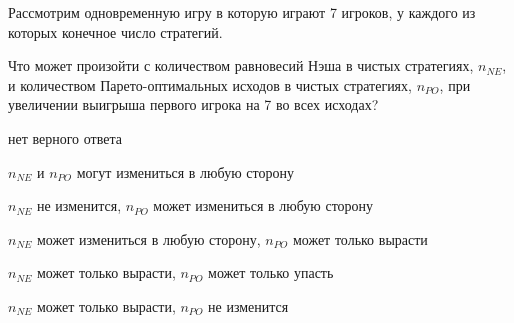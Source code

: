 
\begin{question}
Рассмотрим одновременную игру в которую играют 7 игроков, у каждого из
которых конечное число стратегий.

Что может произойти с количеством равновесий Нэша в чистых стратегиях,
\(n_{NE}\), и количеством Парето-оптимальных исходов в чистых
стратегиях, \(n_{PO}\), при увеличении выигрыша первого игрока на 7 во
всех исходах?
\begin{answerlist}
  \item нет верного ответа
  \item \(n_{NE}\) и \(n_{PO}\) могут измениться в любую сторону
  \item \(n_{NE}\) не изменится, \(n_{PO}\) может измениться в любую сторону
  \item \(n_{NE}\) может измениться в любую сторону, \(n_{PO}\) может только
вырасти
  \item \(n_{NE}\) может только вырасти, \(n_{PO}\) может только упасть
  \item \(n_{NE}\) может только вырасти, \(n_{PO}\) не изменится
\end{answerlist}
\end{question}


